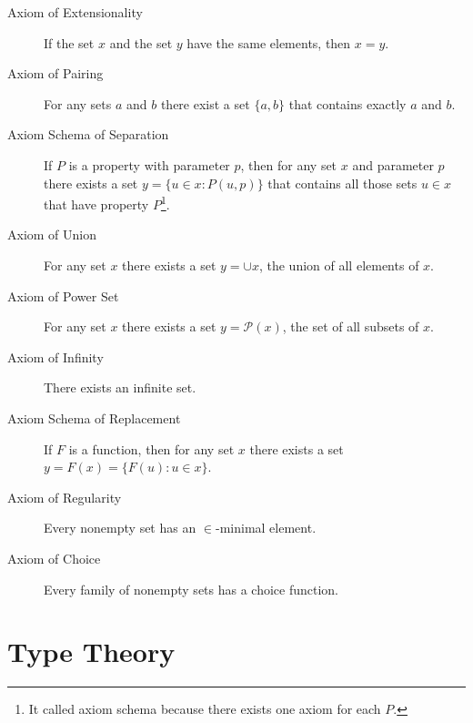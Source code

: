 \begin{description}

\item[Axiom of Extensionality] If the set $x$ and the set $y$ have the same elements, then $x=y$.

\item[Axiom of Pairing] For any sets $a$ and $b$ there exist a set $\{a, b\}$ that contains exactly $a$ and $b$.

\item[Axiom Schema of Separation] If $P$ is a property with parameter $p$, then for any set $x$ and parameter $p$ there exists a set $y=\{u \in x : P(u,p) \}$ that contains all those sets $u \in x$ that have property $P$\footnote{It called axiom schema because there exists one axiom for each $P$.}.

\item[Axiom of Union] For any set $x$ there exists a set $y = \cup x$, the union of all elements of $x$. 

\item[Axiom of Power Set] For any set $x$ there exists a set $y = \mathcal{P}(x)$, the set of all subsets of $x$.

\item[Axiom of Infinity] There exists an infinite set.

\item[Axiom Schema of Replacement] If $F$ is a function, then for any set $x$ there exists a set $y = F(x) = \{F(u) : u \in x \}$. 

\item[Axiom of Regularity] Every nonempty set has an $\in$-minimal element.

\item[Axiom of Choice] Every family of nonempty sets has a choice function.

\end{description}


%
%

\section{Type Theory}

